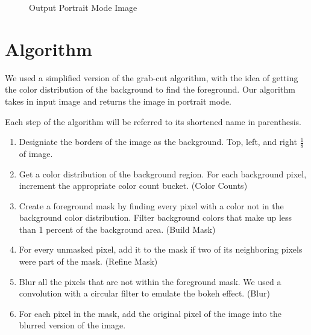 \documentclass[12pt]{article}
\begin{document}
\begin{figure}[!htb]
\begin{minipage}{0.48\textwidth}
        \caption{Output Portrait Mode Image}
    \end{minipage}\hfill
\end{figure}

\section{Algorithm}

We used a simplified version of the grab-cut algorithm, with the idea of
getting the color distribution of the background to find the foreground. Our
algorithm takes in input image and returns the image in portrait mode.

Each step of the algorithm will be referred to its shortened name in
parenthesis.

\begin{enumerate}
    \item
        Designiate the borders of the image as the background. Top, left, and
        right $\tfrac{1}{8}$ of image.
    \item
        Get a color distribution of the background region. For each background
        pixel, increment the appropriate color count bucket. (Color Counts)
    \item
        Create a foreground mask by finding every pixel with a color not
        in the background color distribution. Filter background colors that
        make up less than 1 percent of the background area. (Build Mask)
    \item
        For every unmasked pixel, add it to the mask if two of its neighboring
        pixels were part of the mask. (Refine Mask)
    \item
        Blur all the pixels that are not within the foreground mask. We used a
        convolution with a circular filter to emulate the bokeh effect. (Blur)
    \item
        For each pixel in the mask, add the original pixel of the image into
        the blurred version of the image.
\end{enumerate}
\end{document}
